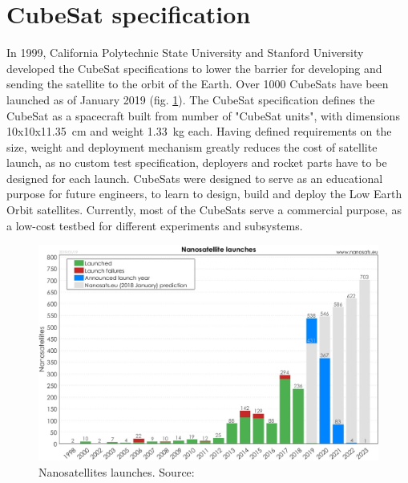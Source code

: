 \section{CubeSat specification}
In 1999, California Polytechnic State University and Stanford University developed the CubeSat specifications to lower the barrier for developing and sending the satellite to the orbit of the Earth. Over 1000 CubeSats have been launched as of January 2019 (fig. \ref{nanosatellites_launched_by_years}). The CubeSat specification \cite{cubesat_spec} defines the CubeSat as a spacecraft built from number of "CubeSat units", with dimensions \si{10}x\si{10}x\SI{11.35}{\cm} and weight \SI{1.33}{\kilo\gram} each. Having defined requirements on the size, weight and deployment mechanism greatly reduces the cost of satellite launch, as no custom test specification, deployers and rocket parts have to be designed for each launch. CubeSats were designed to serve as an educational purpose for future engineers, to learn to design, build and deploy the Low Earth Orbit satellites. Currently, most of the CubeSats serve a commercial purpose, as a low-cost testbed for different experiments and subsystems.

\begin{figure}[h]
    \centering
    \includegraphics[width=0.65\paperwidth]{img/3/nanosatellites_launched_by_years.jpg}
    \caption{Nanosatellites launches. Source: \cite{nanosatellites_launched_by_years}}
    \label{nanosatellites_launched_by_years}
\end{figure}

\newpage

